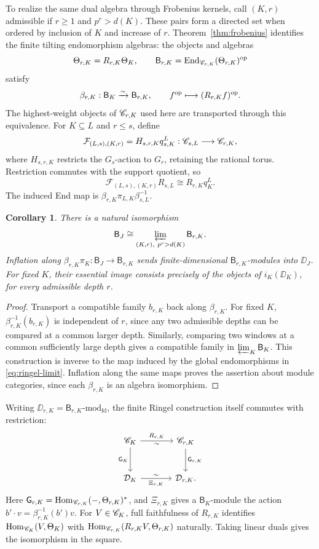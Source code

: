 \documentclass[11pt,reqno]{amsart}
\newcommand{\Hom}{\operatorname{Hom}}\newcommand{\End}{\operatorname{End}}\newcommand{\Ext}{\operatorname{Ext}}
\newcommand{\BJ}{\mathsf B_J}\newcommand{\BK}{\mathsf B_K}\newcommand{\TJ}{\mathbb T_J}\newcommand{\GK}{\mathsf G_K}\newcommand{\GJ}{\mathsf G_J}
\newtheorem{corollary}[theorem]{Corollary}
\theoremstyle{definition}
\theoremstyle{remark}
\numberwithin{equation}{section}
\begin{document}
To realize the same dual algebra through Frobenius kernels, call
$(K,r)$ admissible if $r\geq1$ and $p^r>d(K)$. These pairs form a
directed set when ordered by inclusion of $K$ and increase of $r$.
Theorem~\ref{thm:frobenius} identifies the finite tilting endomorphism
algebras: the objects and algebras
\[
 \Theta_{r,K}=R_{r,K}\Theta_K,\qquad
 \mathsf B_{r,K}=\End_{\CC_{r,K}}(\Theta_{r,K})^{\op}
\]
satisfy
\[
 \beta_{r,K}:\BK\xrightarrow{\sim}\mathsf B_{r,K},
 \qquad f^{\op}\longmapsto(R_{r,K}f)^{\op}.
\]
The highest-weight objects of $\mathscr C_{r,K}$ used here are transported
through this equivalence. For $K\subseteq L$ and $r\leq s$, define
\[
 \mathcal F_{(L,s),(K,r)}=H_{s,r,K}q_{s,K}^L:
 \mathscr C_{s,L}\longrightarrow\mathscr C_{r,K},
\]
where $H_{s,r,K}$ restricts the $G_s$-action to $G_r$, retaining the
rational torus. Restriction commutes with the support quotient, so
\[
 \mathcal F_{(L,s),(K,r)}R_{s,L}\cong R_{r,K}q_K^L.
\]
The induced End map is
$\beta_{r,K}\pi_{L,K}\beta_{s,L}^{-1}$.

\begin{corollary}\label{cor:frobenius-ringel}
There is a natural isomorphism
\begin{equation}\label{eq:frobenius-ringel-limit}
 \BJ\cong\varprojlim_{(K,r),\ p^r>d(K)}\mathsf B_{r,K}.
\end{equation}
Inflation along $\beta_{r,K}\pi_K:\BJ\to\mathsf B_{r,K}$ sends
finite-dimensional $\mathsf B_{r,K}$-modules into $\DD_J$.
For fixed $K$, their essential image consists precisely of the
objects of $i_K(\DD_K)$, for every admissible depth $r$.
\end{corollary}

\begin{proof}
Transport a compatible family $b_{r,K}$ back along $\beta_{r,K}$.
For fixed $K$, $\beta_{r,K}^{-1}(b_{r,K})$ is independent of $r$, since
any two admissible depths can be compared at a common larger depth.
Similarly, comparing two windows at a common sufficiently large depth
gives a compatible family in $\varprojlim_K\BK$. This construction
is inverse to the map induced by the global endomorphisms in
\eqref{eq:ringel-limit}. Inflation along the same maps proves the
assertion about module categories, since each $\beta_{r,K}$ is an
algebra isomorphism.
\end{proof}

Writing $\DD_{r,K}=\mathsf B_{r,K}\text{-}\mathrm{mod}_{\mathrm{fd}}$,
the finite Ringel construction itself commutes with restriction:
\begin{equation}\label{eq:frobenius-ringel-square}
\begin{tikzcd}[column sep=large,row sep=large]
 \CC_K \arrow[r,"R_{r,K}","\sim"'] \arrow[d,"\GK"'] &
 \CC_{r,K} \arrow[d,"\mathsf G_{r,K}"] \\
 \DD_K \arrow[r,"\Xi_{r,K}"',"\sim"] & \DD_{r,K}.
\end{tikzcd}
\end{equation}
Here $\mathsf G_{r,K}=\Hom_{\CC_{r,K}}(-,\Theta_{r,K})^*$,
and $\Xi_{r,K}$ gives a $\BK$-module the action
$b'\cdot v=\beta_{r,K}^{-1}(b')v$.
For $V\in\mathscr C_K$, full faithfulness of $R_{r,K}$ identifies
$\Hom_{\CC_K}(V,\Theta_K)$ with
$\Hom_{\CC_{r,K}}(R_{r,K}V,\Theta_{r,K})$ naturally.
Taking linear duals gives the isomorphism in the square.
\end{document}
